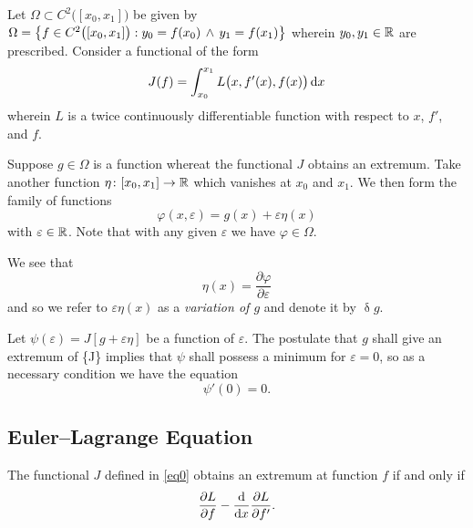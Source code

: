 Let \(\Omega \subset C^2\big([x_0, x_1]\big)\) be given by \(\Omega = \set*{f \in C^2\big([x_0, x_1]\big) : y_0 = f(x_0)
\, \land \, y_1 = f(x_1)}\) wherein \(y_0, y_1 \in \setreal\) are prescribed. Consider a functional of the form
\begin{align}
  \label{eq0}
  J(f) = \int_{x_0}^{x_1} L\big(x, f'(x), f(x)\big) \diff x
\end{align}
wherein \(L\) is a twice continuously differentiable function with respect to \(x\), \(f'\), and \(f\).

Suppose \(g \in \Omega\) is a function whereat the functional \(J\) obtains an extremum. Take another function
\(\map{\eta}{[x_0, x_1]}{\setreal}\) which vanishes at \(x_0\) and \(x_1\). We then form the family of functions
\[
  \varphi(x, \varepsilon) = g(x) + \varepsilon \eta(x)
\]
with \(\varepsilon \in \setreal\). Note that with any given \(\varepsilon\) we have \(\varphi \in \Omega\).

We see that
\[
  \eta(x) = \frac{\partial \varphi}{\partial \varepsilon}
\]
and so we refer to \(\varepsilon \eta(x)\) as a \emph{variation of \(g\)} and denote it by \(\updelta g\).

Let \(\psi(\varepsilon) = J[g + \varepsilon \eta]\) be a function of \(\varepsilon\). The postulate that \(g\) shall
give an extremum of \{J\} implies that \(\psi\) shall possess a minimum for \(\varepsilon = 0\), so as a necessary
condition we have the equation
\[
  \psi'(0) = 0.
\]

\subsection{Euler--Lagrange Equation}

  The functional \(J\) defined in \eqref{eq0} obtains an extremum at function \(f\) if and only if
  \[
    \frac{\partial L}{\partial f} - \frac{\diff}{\diff x} \frac{\partial L}{\partial f'}.
  \]
\Eth

\Edc

